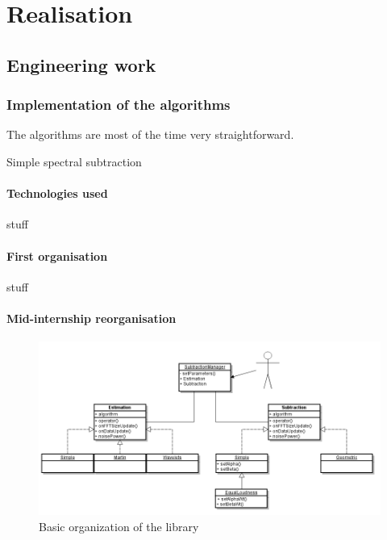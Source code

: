 \section{Realisation}
\subsection{Engineering work}
\subsubsection{Implementation of the algorithms}
The algorithms are most of the time very straightforward.


\begin{algorithm}
 \SetAlgoLined

 \caption{Simple spectral subtraction}
\end{algorithm}

\paragraph{Technologies used}
stuff
\paragraph{First organisation}
stuff
\paragraph{Mid-internship reorganisation}
\begin{figure}[H]
\begin{center}
\includegraphics[scale=0.5]{diagclass.png}
\caption{Basic organization of the library}
\label{diag_api_chords}
\end{center}
\end{figure}

